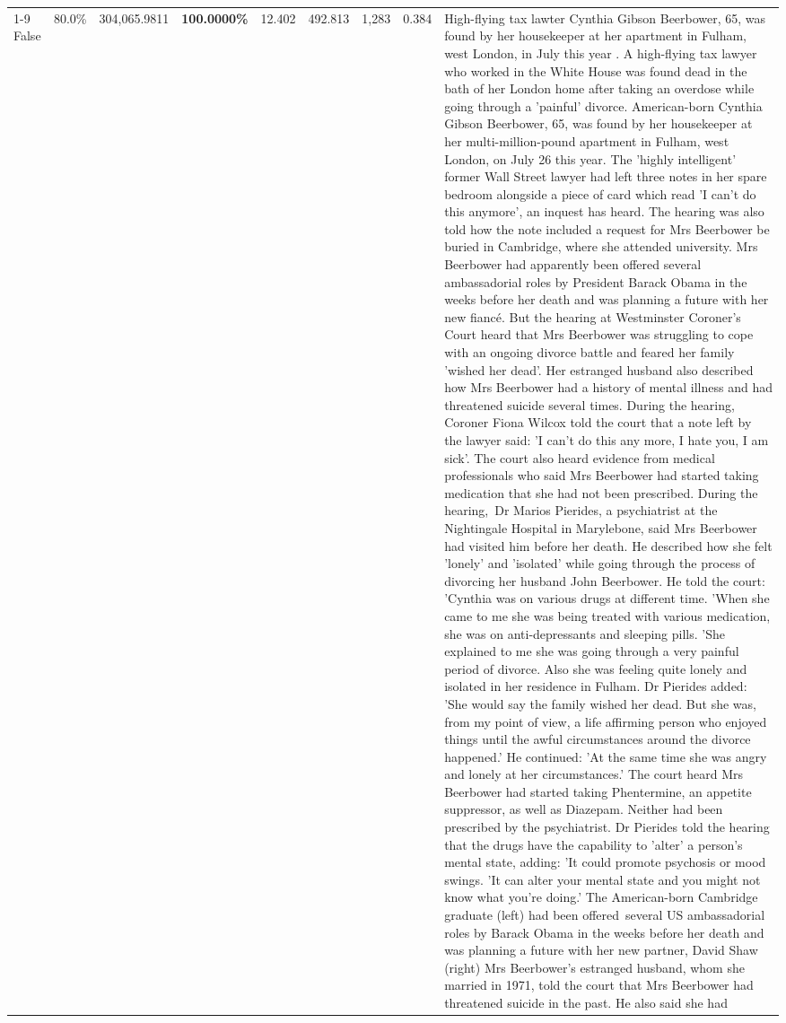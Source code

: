 \begin{table}[H]
\begin{tabular}{lllrlllll}
\cline{1-9}
False & 80.0\% & \color{red} 304,065.9811 & \bfseries \color{red} 100.0000\% & 12.402 & 492.813 & 1,283 & 0.384 & High-flying tax lawter Cynthia Gibson Beerbower, 65, was found by her housekeeper at her apartment in Fulham, west London, in July this year . A high-flying tax lawyer who worked in the White House was found dead in the bath of her London home after taking an overdose while going through a 'painful' divorce. American-born Cynthia Gibson Beerbower, 65, was found by her housekeeper at her multi-million-pound apartment in Fulham, west London, on July 26 this year. The 'highly intelligent' former Wall Street lawyer had left three notes in her spare bedroom alongside a piece of card which read 'I can't do this anymore', an inquest has heard. The hearing was also told how the note included a request for Mrs Beerbower be buried in Cambridge, where she attended university. Mrs Beerbower had apparently been offered several ambassadorial roles by President Barack Obama in the weeks before her death and was planning a future with her new fiancé. But the hearing at Westminster Coroner's Court heard that Mrs Beerbower was struggling to cope with an ongoing divorce battle and feared her family 'wished her dead'. Her estranged husband also described how Mrs Beerbower had a history of mental illness and had threatened suicide several times. During the hearing, Coroner Fiona Wilcox told the court that a note left by the lawyer said: 'I can't do this any more, I hate you, I am sick'. The court also heard evidence from medical professionals who said Mrs Beerbower had started taking medication that she had not been prescribed. During the hearing, Dr Marios Pierides, a psychiatrist at the Nightingale Hospital in Marylebone, said Mrs Beerbower had visited him before her death. He described how she felt 'lonely' and 'isolated' while going through the process of divorcing her husband John Beerbower. He told the court: 'Cynthia was on various drugs at different time. 'When she came to me she was being treated with various medication, she was on anti-depressants and sleeping pills. 'She explained to me she was going through a very painful period of divorce. Also she was feeling quite lonely and isolated in her residence in Fulham. Dr Pierides added: 'She would say the family wished her dead. But she was, from my point of view, a life affirming person who enjoyed things until the awful circumstances around the divorce happened.' He continued: 'At the same time she was angry and lonely at her circumstances.' The court heard Mrs Beerbower had started taking Phentermine, an appetite suppressor, as well as Diazepam. Neither had been prescribed by the psychiatrist. Dr Pierides told the hearing that the drugs have the capability to 'alter' a person's mental state, adding: 'It could promote psychosis or mood swings. 'It can alter your mental state and you might not know what you're doing.' The American-born Cambridge graduate (left) had been offered several US ambassadorial roles by Barack Obama in the weeks before her death and was planning a future with her new partner, David Shaw (right) Mrs Beerbower's estranged husband, whom she married in 1971, told the court that Mrs Beerbower had threatened suicide in the past. He also said she had 
\end{tabular}
\end{table}
